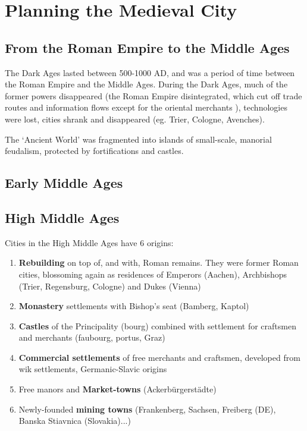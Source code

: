 \documentclass{article}
\newcommand{\alignedmarginpar}[1]{%
        \marginpar{\raggedright\small #1}
    }
\begin{document}
\section{Planning the Medieval City}

\subsection{From the Roman Empire to the Middle Ages}

The Dark Ages lasted between 500-1000 AD, and was a period of time between the Roman Empire and the Middle Ages. During the Dark Ages, much of the former powers disappeared (the Roman Empire disintegrated, which cut off trade routes and information flows except for the oriental merchants\alignedmarginpar{Orient = non-Latin speaking}), technologies were lost, cities shrank and disappeared (eg. Trier, Cologne, Avenches). 

The `Ancient World' was fragmented into islands of small-scale, manorial feudalism, protected by fortifications and castles. 

\subsection{Early Middle Ages}

\subsection{High Middle Ages}

Cities in the High Middle Ages have 6 origins:

\begin{enumerate}
	\item \textbf{Rebuilding} on top of, and with, Roman remains. They were former Roman cities, blossoming again as residences of Emperors (Aachen), Archbishops (Trier, Regensburg, Cologne) and Dukes (Vienna)
	\item \textbf{Monastery} settlements with Bishop's seat (Bamberg, Kaptol)
	\item \textbf{Castles} of the Principality (bourg) combined with settlement for craftsmen and merchants (faubourg, portus, Graz)
	\item \textbf{Commercial settlements} of free merchants and craftsmen, developed from wik settlements, Germanic-Slavic origins
	\item Free manors and \textbf{Market-towns} (Ackerbürgerstädte)
	\item Newly-founded \textbf{mining towns} (Frankenberg, Sachsen, Freiberg (DE), Banska Stiavnica (Slovakia)...)
\end{enumerate}
\end{document}
